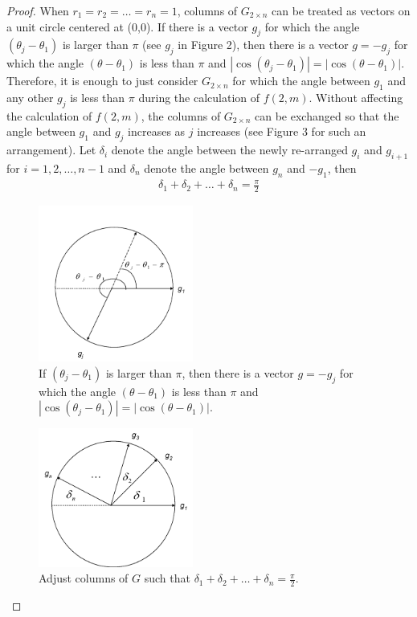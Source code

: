 \documentclass{sig-alternate}
\begin{document}
\begin{proof}
When $r_1=r_2=\ldots=r_n=1$, columns of $G_{2 \times n}$ can be treated 
as vectors on a unit circle centered at (0,0). 
If there is a vector $g_j$ for which the angle $(\theta_j -\theta_1)$ 
is larger than $\pi$ (see $g_j$ in Figure 2), then
there is a vector $g=-g_j$ for which the angle $(\theta -\theta_1)$
is less than $\pi$ and $|\cos (\theta_j -\theta_1)| = |\cos (\theta -\theta_1)|$.
Therefore, it is enough to just consider $G_{2 \times n}$  for which the angle 
between $g_1$ and any other $g_j$ is less than $\pi$ during the calculation
of $f(2,m)$. Without affecting the calculation of $f(2,m)$, 
the columns of $G_{2 \times n}$ can be exchanged
so that the angle between $g_1$ and $g_j$ increases as $j$ increases
(see Figure 3 for such an arrangement). Let $\delta_i$ denote the angle
between the newly re-arranged $g_i$ and $g_{i+1}$ for $i=1,2,\ldots,n-1$ and 
$\delta_n$ denote the angle between $g_n$ and $-g_1$, then
\begin{eqnarray}
\delta_1 + \delta_2 + \ldots + \delta_n=\frac{\pi}{2}
\end{eqnarray}
\begin{figure}
\centering
\includegraphics[width=2in]{opt_2erasures_results.png}
\caption{If $(\theta_j -\theta_1)$ is larger than $\pi$, 
then there is a vector $g=-g_j$ for which the angle $(\theta -\theta_1)$
is less than $\pi$ and $|\cos (\theta_j -\theta_1)| = |\cos (\theta -\theta_1)|$.}
\label{spherical ball}
\end{figure}
\begin{figure}
\centering
\includegraphics[width=2in]{opt_2erasures_angle.png}
\caption{Adjust columns of $G$ such that $\delta_1 + \delta_2 + \ldots + \delta_n = \frac{\pi}{2}$.}
\label{spherical ball}
\end{figure}



\end{proof}
\end{document}
